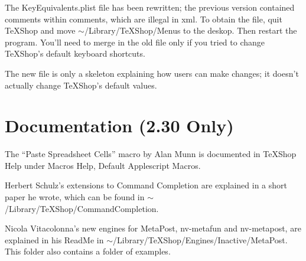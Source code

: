 \documentclass[11pt, oneside]{amsart}
\begin{document}
The KeyEquivalents.plist file has been rewritten; the previous version contained comments within comments, which are illegal in xml. To obtain the file, quit TeXShop and move $\sim$/Library/TeXShop/Menus to the deskop. Then restart the program. You'll need to merge in the old file only if you tried to change TeXShop's default keyboard shortcuts. 

The new file is only a skeleton explaining how users can make changes; it doesn't actually change TeXShop's default values.

\section{Documentation (2.30 Only)}

The ``Paste Spreadsheet Cells'' macro by Alan Munn is documented in TeXShop Help under Macros Help, Default Applescript Macros.

Herbert Schulz's extensions to Command Completion are explained in a short paper he wrote, which can be found in $\sim$/Library/TeXShop/CommandCompletion.

Nicola Vitacolonna's new engines for MetaPost, nv-metafun and nv-metapost, are explained in his ReadMe in
$\sim$/Library/TeXShop/Engines/Inactive/MetaPost. This folder also contains a folder of examples.



\end{document}
